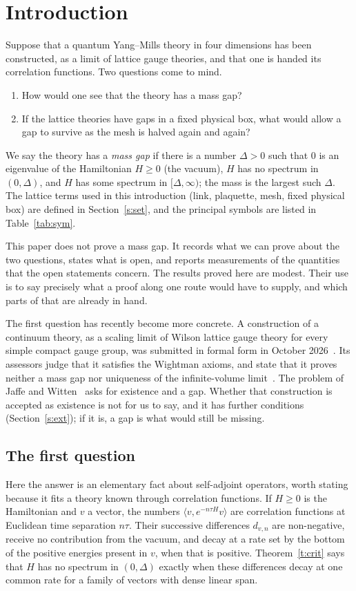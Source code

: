 \section{Introduction}\label{s:intro}

Suppose that a quantum Yang--Mills theory in four dimensions has been constructed, as a limit of lattice
gauge theories, and that one is handed its correlation functions. Two questions come to mind.
\begin{enumerate}
\item How would one see that the theory has a mass gap?
\item If the lattice theories have gaps in a fixed physical box, what would allow a gap to survive as the
mesh is halved again and again?
\end{enumerate}
We say the theory has a \emph{mass gap} if there is a number $\Delta>0$ such that $0$ is an eigenvalue of the
Hamiltonian $H\ge0$ (the vacuum), $H$ has no spectrum in $(0,\Delta)$, and $H$ has some spectrum in
$[\Delta,\infty)$; the mass is the largest such $\Delta$. The lattice terms used in this introduction (link,
plaquette, mesh, fixed physical box) are defined in Section~\ref{s:set}, and the principal symbols are
listed in Table~\ref{tab:sym}.

This paper does not prove a mass gap. It records what we can prove about the two questions, states what is
open, and reports measurements of the quantities that the open statements concern. The results proved
here are modest. Their use is to say precisely what a proof along one route would have to supply, and which
parts of that are already in hand.

The first question has recently become more concrete. A construction of a continuum theory, as a scaling
limit of Wilson lattice gauge theory for every simple compact gauge group, was submitted in formal form in
October 2026~\cite{OAI}. Its assessors judge that it satisfies the Wightman axioms, and state that it proves
neither a mass gap nor uniqueness of the infinite-volume limit~\cite[p.~1]{YMG}. The problem of Jaffe and
Witten~\cite[\S4]{JW} asks for existence and a gap. Whether that construction is accepted as existence is not
for us to say, and it has further conditions (Section~\ref{s:ext}); if it is, a gap is what would still be
missing.

\subsection{The first question}
Here the answer is an elementary fact about self-adjoint operators, worth stating because it fits a theory
known through correlation functions. If $H\ge0$ is the Hamiltonian and $v$ a vector, the numbers
$\langle v,e^{-n\tau H}v\rangle$ are correlation functions at Euclidean time separation $n\tau$. Their
successive differences $d_{v,n}$ are non-negative, receive no contribution from the vacuum, and decay at a
rate set by the bottom of the positive energies present in $v$, when that is positive. Theorem~\ref{t:crit} says that $H$ has no spectrum in
$(0,\Delta)$ exactly when these differences decay at one common rate for a family of vectors with dense
linear span.

